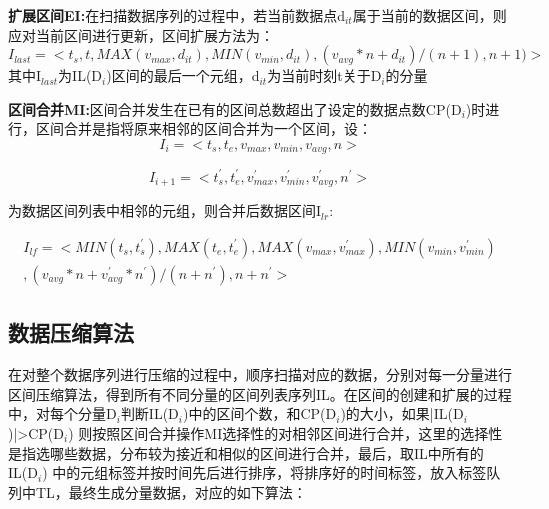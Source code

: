 \textbf{扩展区间EI:}在扫描数据序列的过程中，若当前数据点d$_{it}$属于当前的数据区间，则应对当前区间进行更新，区间扩展方法为：
\begin{equation}
I_{last}=<t_{s},t,MAX(v_{max},d_{it}),MIN(v_{min},d_{it}),(v_{avg}*n+d_{it})/(n+1),n+1)>
\end{equation}
其中I$_{last}$为IL(D$_{i}$)区间的最后一个元组，d$_{it}$为当前时刻t关于D$_{i}$的分量


\textbf{区间合并MI:}区间合并发生在已有的区间总数超出了设定的数据点数CP(D$_{i}$)时进行，区间合并是指将原来相邻的区间合并为一个区间，设：
\begin{equation}
I_{i}=<t_{s},t_{e},v_{max},v_{min},v_{avg},n>
\end{equation}


\begin{equation}
I_{i+1}=<t_{s}^{'},t_{e}^{'},v_{max}^{'},v_{min}^{'},v_{avg}^{'},n^{'}>
\end{equation}

为数据区间列表中相邻的元组，则合并后数据区间I$_{lr}$:

\begin{equation}
\begin{split}
I_{lf}=<MIN(t_{s},t_{s}^{'}),MAX(t_{e},t_{e}^{'}),MAX(v_{max},v_{max}^{'}),MIN(v_{min},v_{min}^{'})\\
,(v_{avg}*n+v_{avg}^{'}*n^{'})/(n+n^{'}),n+n^{'}>
\end{split}
\end{equation}


\subsection{数据压缩算法}
\label{4.14}
在对整个数据序列进行压缩的过程中，顺序扫描对应的数据，分别对每一分量进行区间压缩算法，得到所有不同分量的区间列表序列IL。在区间的创建和扩展的过程
中，对每个分量D$_{i}$判断IL(D$_{i}$)中的区间个数，和CP(D$_{i}$)的大小，如果|IL(D$_{i}$)|>CP(D$_{i}$)
则按照区间合并操作MI选择性的对相邻区间进行合并，这里的选择性是指选哪些数据，分布较为接近和相似的区间进行合并，最后，取IL中所有的IL(D$_{i}$)
中的元组标签并按时间先后进行排序，将排序好的时间标签，放入标签队列中TL，最终生成分量数据，对应的如下算法：
\newpage


